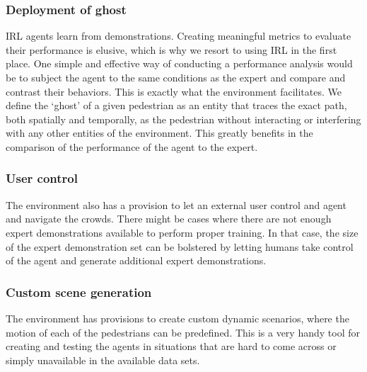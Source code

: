 \subsubsection{Deployment of ghost}
IRL agents learn from demonstrations. Creating meaningful metrics to evaluate their performance is elusive, which is why we resort to using IRL in the first place. One simple and effective way of conducting a performance analysis would be to subject the agent to the same conditions as the expert and compare and contrast their behaviors. This is exactly what the environment facilitates. We define the `ghost' of a given pedestrian as an entity that traces the exact path, both spatially and temporally, as the pedestrian without interacting or interfering with any other entities of the environment. This greatly benefits in the comparison of the performance of the agent to the expert.

\subsubsection{User control}
The environment also has a provision to let an external user control and agent and navigate the crowds. There might be cases where there are not enough expert demonstrations available to perform proper training. In that case, the size of the expert demonstration set can be bolstered by letting humans take control of the agent and generate additional expert demonstrations.


\subsubsection{Custom scene generation}
The environment has provisions to create custom dynamic scenarios, where the motion of each of the pedestrians can be predefined. This is a very handy tool for creating and testing the agents in situations that are hard to come across or simply unavailable in the available data sets.\\



